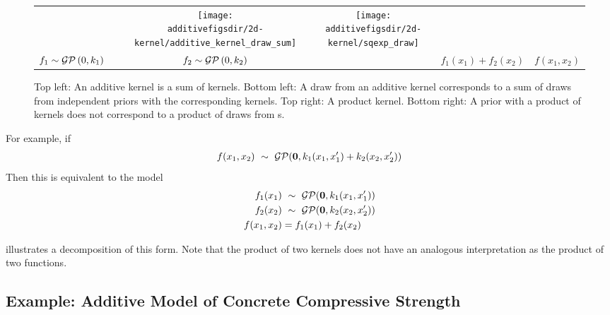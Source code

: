 \begin{figure}[h!]
\begin{tabular}{ccccc|c}
& \hspace{-0.4cm} \raisebox{1cm}{=} \hspace{-0.4cm} &
\texttt{[image: \\additivefigsdir/2d-kernel/additive\_kernel\_draw\_sum]} &
\texttt{[image: \\additivefigsdir/2d-kernel/sqexp\_draw]} \\
$f_1 \sim \mathcal{GP}\left(0, k_1\right)$ & & $f_2 \sim \mathcal{GP}\left(0, k_2\right)$ & & $f_1(x_1) + f_2(x_2)$ & $f(x_1, x_2)$ \\
\end{tabular}
\caption[Additive kernels correspond to additive functions]{
Top left: An additive kernel is a sum of kernels.
Bottom left:  A draw from an additive kernel corresponds to a sum of draws from independent \gp{} priors with the corresponding kernels.
Top right: A product kernel.
Bottom right:  A \gp{} prior with a product of kernels does not correspond to a product of draws from \gp{}s.
}
\label{fig:kernels}
\end{figure}
%
For example, if
%
\begin{align}
f(x_1, x_2) \ \sim\  \mathcal{GP}({\bf{0}}, k_1(x_1, x_1') + k_2(x_2, x_2'))
\end{align}
%
Then this is equivalent to the model
%
\begin{align}
f_1(x_1) & \ \sim\  \mathcal{GP}({\bf{0}}, k_1(x_1, x_1'))\\
f_2(x_2) & \ \sim\  \mathcal{GP}({\bf{0}}, k_2(x_2, x_2'))\\
f(x_1, x_2) & = f_1(x_1) + f_2(x_2)
\end{align}
%
%

 illustrates a decomposition of this form.
Note that the product of two kernels does not have an analogous interpretation as the product of two functions.



\subsection{Example: Additive Model of Concrete Compressive Strength}
\label{sec:concrete}

